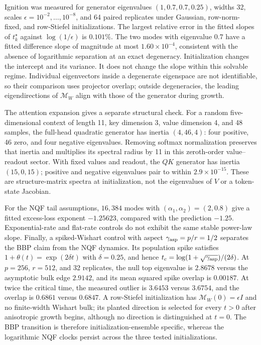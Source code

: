 \documentclass[11pt,a4paper]{article}
\theoremstyle{definition}
\begin{document}
Ignition was measured for generator eigenvalues $(1,0.7,0.7,0.25)$, widths 32, scales
$\epsilon=10^{-2},\ldots,10^{-8}$, and 64 paired replicates under Gaussian, row-norm-
fixed, and row-Stiefel initializations.  The largest relative error in the fitted
slopes of $t_k^\star$ against $\log(1/\epsilon)$ is $0.101\%$.  The two modes with
eigenvalue $0.7$ have a fitted difference slope of magnitude at most
$1.60\times10^{-4}$, consistent with the absence of logarithmic separation at an
exact degeneracy.  Initialization changes the intercept and its variance.  It does
not change the slope within this solvable regime.  Individual eigenvectors inside a
degenerate eigenspace are not identifiable, so their comparison uses projector
overlap; outside degeneracies, the leading eigendirections of $\mathcal M_W$ align
with those of the generator during growth.

The attention expansion gives a separate structural check.  For a random
five-dimensional context of length 11, key dimension 3, value dimension 4, and 48
samples, the full-head quadratic generator has inertia $(4,46,4)$: four positive,
46 zero, and four negative eigenvalues.  Removing softmax normalization preserves
that inertia and multiplies its spectral radius by 11 in this zeroth-order
value--readout sector.  With fixed values and readout, the $QK$ generator has inertia
$(15,0,15)$; positive and negative eigenvalues pair to within
$2.9\times10^{-15}$.  These are structure-matrix spectra at initialization, not the
eigenvalues of $V$ or a token-state Jacobian.

For the NQF tail assumptions, $16{,}384$ modes with
$(\alpha_1,\alpha_2)=(2,0.8)$ give a fitted excess-loss exponent $-1.25623$, compared
with the prediction $-1.25$.  Exponential-rate and flat-rate controls do not exhibit
the same stable power-law slope.  Finally, a spiked-Wishart control with aspect
$\gamma_{\rm asp}=p/r=1/2$ separates the BBP claim from the NQF dynamics.  Its
population spike satisfies $1+\theta(t)=\exp(2\delta t)$ with $\delta=0.25$, and hence
$t_c=\log(1+\sqrt{\gamma_{\rm asp}})/(2\delta)$.  At $p=256$, $r=512$, and 32
replicates, the null top eigenvalue is $2.8678$ versus the asymptotic bulk edge
$2.9142$, and its mean squared spike overlap is $0.00187$.  At twice the critical
time, the measured outlier is $3.6453$ versus $3.6754$, and the overlap is $0.6861$
versus $0.6847$.  A row-Stiefel initialization has
$\mathcal M_W(0)=\epsilon I$ and no finite-width Wishart bulk; its planted direction
is selected for every $t>0$ after anisotropic growth begins, although no direction is
distinguished at $t=0$.  The BBP transition is therefore initialization-ensemble
specific, whereas the logarithmic NQF clocks persist across the three tested
initializations.
\end{document}
